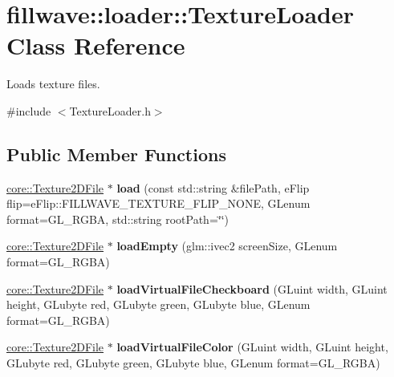 \hypertarget{classfillwave_1_1loader_1_1TextureLoader}{}\section{fillwave\+:\+:loader\+:\+:Texture\+Loader Class Reference}
\label{classfillwave_1_1loader_1_1TextureLoader}


Loads texture files.  




{\ttfamily \#include $<$Texture\+Loader.\+h$>$}

\subsection*{Public Member Functions}
\begin{DoxyCompactItemize}
\item 
\hypertarget{classfillwave_1_1loader_1_1TextureLoader_a7616ab40df2bbcf819d4e5f3201a2868}{}\hyperlink{classfillwave_1_1core_1_1Texture2DFile}{core\+::\+Texture2\+D\+File} $\ast$ {\bfseries load} (const std\+::string \&file\+Path, e\+Flip flip=e\+Flip\+::\+F\+I\+L\+L\+W\+A\+V\+E\+\_\+\+T\+E\+X\+T\+U\+R\+E\+\_\+\+F\+L\+I\+P\+\_\+\+N\+O\+N\+E, G\+Lenum format=G\+L\+\_\+\+R\+G\+B\+A, std\+::string root\+Path=\char`\"{}\char`\"{})\label{classfillwave_1_1loader_1_1TextureLoader_a7616ab40df2bbcf819d4e5f3201a2868}

\item 
\hypertarget{classfillwave_1_1loader_1_1TextureLoader_af2ea2c760bbfae96ef4b36fb387c4ea8}{}\hyperlink{classfillwave_1_1core_1_1Texture2DFile}{core\+::\+Texture2\+D\+File} $\ast$ {\bfseries load\+Empty} (glm\+::ivec2 screen\+Size, G\+Lenum format=G\+L\+\_\+\+R\+G\+B\+A)\label{classfillwave_1_1loader_1_1TextureLoader_af2ea2c760bbfae96ef4b36fb387c4ea8}

\item 
\hypertarget{classfillwave_1_1loader_1_1TextureLoader_a41e3375108af37b47e25c88b9d721b5b}{}\hyperlink{classfillwave_1_1core_1_1Texture2DFile}{core\+::\+Texture2\+D\+File} $\ast$ {\bfseries load\+Virtual\+File\+Checkboard} (G\+Luint width, G\+Luint height, G\+Lubyte red, G\+Lubyte green, G\+Lubyte blue, G\+Lenum format=G\+L\+\_\+\+R\+G\+B\+A)\label{classfillwave_1_1loader_1_1TextureLoader_a41e3375108af37b47e25c88b9d721b5b}

\item 
\hypertarget{classfillwave_1_1loader_1_1TextureLoader_a64c9672227d903c96103466fa7e429ea}{}\hyperlink{classfillwave_1_1core_1_1Texture2DFile}{core\+::\+Texture2\+D\+File} $\ast$ {\bfseries load\+Virtual\+File\+Color} (G\+Luint width, G\+Luint height, G\+Lubyte red, G\+Lubyte green, G\+Lubyte blue, G\+Lenum format=G\+L\+\_\+\+R\+G\+B\+A)\label{classfillwave_1_1loader_1_1TextureLoader_a64c9672227d903c96103466fa7e429ea}


\end{DoxyCompactItemize}
